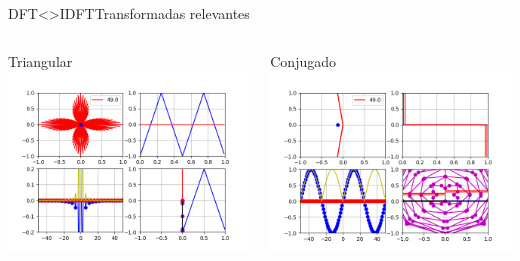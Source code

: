 \begin{frame}{DFT<>IDFT}{Transformadas relevantes}
   \begin{columns}[c]
      \begin{column}{.5\textwidth}
         Triangular
         \centering\includegraphics[width=1.0\textwidth]{4_clase/euler_triangular}
      \end{column}
      \begin{column}{.5\textwidth}
         Conjugado
         \centering\includegraphics[width=1.0\textwidth]{4_clase/euler_conjugado}
      \end{column}
   \end{columns}
   \vfill
\end{frame}
